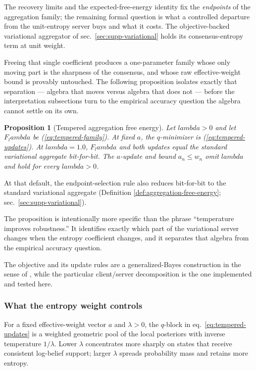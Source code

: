 \documentclass[
  english,
]{article}
\theoremstyle{plain}
\newtheorem{proposition}[theorem]{Proposition}
\theoremstyle{definition}
\theoremstyle{remark}
\theoremstyle{definition}
\begin{document}
The recovery limits and the expected-free-energy identity fix the
\emph{endpoints} of the aggregation family; the remaining formal
question is what a controlled departure from the unit-entropy server
buys and what it costs. The objective-backed variational aggregator of
sec.~\ref{sec:supp-variational} holds its consensus-entropy term at unit
weight.

Freeing that single coefficient produces a one-parameter family whose
only moving part is the sharpness of the consensus, and whose raw
effective-weight bound is provably untouched. The following proposition
isolates exactly that separation --- algebra that moves versus algebra
that does not --- before the interpretation subsections turn to the
empirical accuracy question the algebra cannot settle on its own.

\begin{proposition}[Tempered aggregation free energy]\label{prop:tempered-aggregation}
Let $lambda > 0$ and let $F_lambda$ be (\ref{eq:tempered-family}). At fixed $a$,
the $q$-minimizer is (\ref{eq:tempered-updates}). At
$lambda = 1.0$, $F_lambda$ and both updates equal
the standard variational aggregate bit-for-bit. The $a$-update and bound
$a_n \le w_n$ omit $lambda$ and hold for every $lambda > 0$.
\end{proposition}

At that default, the endpoint-selection rule also reduces bit-for-bit to
the standard variational aggregate (Definition
\ref{def:aggregation-free-energy}; sec.~\ref{sec:supp-variational}).

The proposition is intentionally more specific than the phrase
``temperature improves robustness.'' It identifies exactly which part of
the variational server changes when the entropy coefficient changes, and
it separates that algebra from the empirical accuracy question.

The objective and its update rules are a generalized-Bayes construction
in the sense of \citep{bissiri2016general, knoblauch2022generalized},
while the particular client/server decomposition is the one implemented
and tested here.

\subsubsection{What the entropy weight
controls}\label{sec:formalism-tempered-interpretation}

For a fixed effective-weight vector \(a\) and \(\lambda>0\), the
\(q\)-block in eq.~\ref{eq:tempered-updates} is a weighted geometric
pool of the local posteriors with inverse temperature \(1/\lambda\).
Lower \(\lambda\) concentrates more sharply on states that receive
consistent log-belief support; larger \(\lambda\) spreads probability
mass and retains more entropy.
\end{document}
